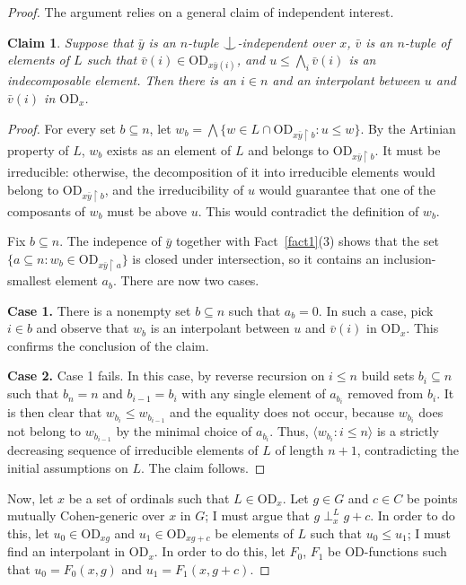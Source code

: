 \documentclass{article}
\newcommand{\vd}{\mathrm{OD}}
\newcommand{\forkindep}[1][]{%
  \mathrel{
    \mathop{
      \vcenter{
        \hbox{\oalign{\noalign{\kern-.3ex}\hfil$\vert$\hfil\cr
              \noalign{\kern-.7ex}
              $\smile$\cr\noalign{\kern-.3ex}}}
      }
    }\displaylimits_{#1}
  }
}
\newtheorem{claim}[theorem]{Claim}
\theoremstyle{definition}
\begin{document}
\begin{proof}
The argument relies on a general claim of independent interest.

\begin{claim}
\label{duplicationclaim}
Suppose that $\bar y$ is an $n$-tuple $\forkindep$-independent over $x$, $\bar v$ is an $n$-tuple of elements of $L$ such that $\bar v(i)\in \vd_{x\bar y(i)}$, and $u\leq\bigwedge_i\bar v(i)$ is an indecomposable element. Then there is an $i\in n$ and an interpolant between $u$ and $\bar v(i)$ in $\vd_x$.
\end{claim}

\begin{proof}
For every set $b\subseteq n$, let $w_b=\bigwedge\{w\in L\cap \vd_{x\bar y\restriction b}\colon u\leq w\}$. By the Artinian property of $L$, $w_b$ exists as an element of $L$ and belongs to $\vd_{x\bar y\restriction b}$. It must be irreducible: otherwise, the decomposition of it into irreducible elements would belong to $\vd_{x\bar y\restriction b}$, and the irreducibility of $u$ would guarantee that one of the composants of $w_b$ must be above $u$. This would contradict the definition of $w_b$.

Fix $b\subseteq n$. The indepence of $\bar y$ together with Fact~\ref{fact1}(3) shows that the set $\{a\subseteq n\colon w_b\in\vd_{x\bar y\restriction a}\}$ is closed under intersection, so it contains an inclusion-smallest element $a_b$. There are now two cases.

\noindent\textbf{Case 1.} There is a nonempty set $b\subseteq n$ such that $a_b=0$. In such a case, pick $i\in b$ and observe that $w_b$ is an interpolant between $u$ and $\bar v(i)$ in $\vd_x$. This confirms the conclusion of the claim.

\noindent\textbf{Case 2.} Case 1 fails. In this case, by reverse recursion on $i\leq n$ build sets $b_i\subseteq n$ such that $b_n=n$ and $b_{i-1}=b_i$ with any single element of $a_{b_i}$ removed from $b_i$. It is then clear that $w_{b_i}\leq w_{b_{i-1}}$ and the equality does not occur, because $w_{b_i}$ does not belong to $w_{b_{i-1}}$ by the minimal choice of $a_{b_i}$. Thus, $\langle w_{b_i}\colon i\leq n\rangle$ is a strictly decreasing sequence of irreducible elements of $L$ of length $n+1$, contradicting the initial assumptions on $L$. The claim follows.
\end{proof}

Now, let $x$ be a set of ordinals such that $L\in\vd_x$. Let $g\in G$ and $c\in C$ be points mutually Cohen-generic over $x$ in $G$; I must argue that $g\perp^L_x g+c$. In order to do this, let $u_0\in \vd_{xg}$ and $u_1\in\vd_{xg+c}$ be elements of $L$ such that $u_0\leq u_1$; I must find an interpolant in $\vd_x$. In order to do this, let $F_0$, $F_1$ be $\vd$-functions such that $u_0=F_0(x, g)$ and $u_1=F_1(x, g+c)$.


\end{proof}
\end{document}
